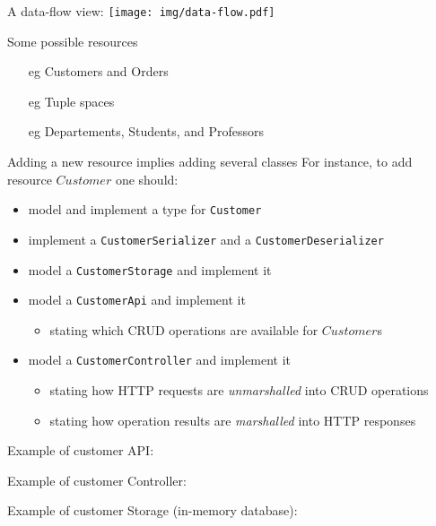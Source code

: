\documentclass[presentation]{beamer}\mode<presentation>{\usetheme{AMSBolognaFC}}
\begin{document}
\begin{frame}[allowframebreaks]
    \framebreak

    A data-flow view:
    \texttt{[image: img/data-flow.pdf]}

    \framebreak

    \begin{exampleblock}{Some possible resources}
        \begin{itemize}
            \item[eg] Customers and Orders
            \item[eg] Tuple spaces
            \item[eg] Departements, Students, and Professors
        \end{itemize}
    \end{exampleblock}

    \begin{alertblock}{Adding a new resource implies adding several classes}
        For instance, to add resource $Customer$ one should:
        \begin{itemize}
            \item model and implement a type for \texttt{Customer}
            \item implement a \texttt{CustomerSerializer} and a \texttt{CustomerDeserializer}
            \item model a \texttt{CustomerStorage} and implement it
            \item model a \texttt{CustomerApi} and implement it
            \begin{itemize}
                \item stating which CRUD operations are available for $Customer$s
            \end{itemize}
            \item model a \texttt{CustomerController} and implement it
            \begin{itemize}
                \item stating how HTTP requests are \emph{unmarshalled} into CRUD operations
                \item stating how operation results are \emph{marshalled} into HTTP responses
            \end{itemize}
        \end{itemize}
    \end{alertblock}

    \framebreak

    Example of customer API:
    

    \framebreak

    Example of customer Controller:
    

    \framebreak

    Example of customer Storage (in-memory database):
    

\end{frame}
\end{document}
